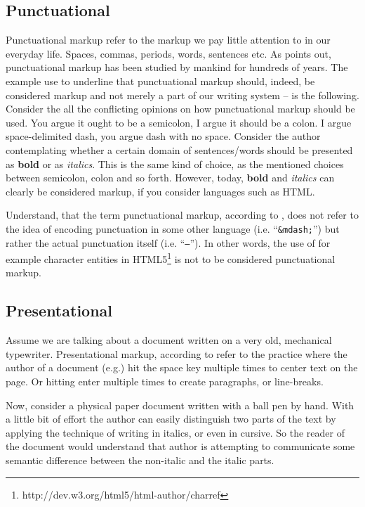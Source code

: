\documentclass{scrreprt}
\begin{document}
\subsection{Punctuational}
Punctuational markup refer to the markup we pay little attention to in our everyday life. Spaces, commas, periods, words, sentences etc. As \citet{coombs} points out, punctuational markup has been studied by mankind for hundreds of years. The example \citet{coombs} use to underline that punctuational markup should, indeed, be considered markup and not merely a part of our writing system -- is the following. Consider the all the conflicting opinions on how punctuational markup should be used. You argue it ought to be a  semicolon, I argue it should be a colon. I argue space-delimited dash, you argue dash with no space. Consider the author contemplating whether a certain domain of sentences/words should be presented as \textbf{bold} or as \textit{italics}. This is the same kind of choice, as the mentioned choices between semicolon, colon and so forth. However, today, \textbf{bold} and \textit{italics} can clearly be considered markup, if you consider languages such as HTML.

Understand, that the term punctuational markup, according to \citet{coombs}, does not refer to the idea of encoding punctuation in some other language (i.e. ``\texttt{\&mdash;}'') but rather the actual punctuation itself (i.e. ``\texttt{--}''). In other words, the use of for example character entities in HTML5\footnote{http://dev.w3.org/html5/html-author/charref} is not to be considered punctuational markup.




\subsection{Presentational}
Assume we are talking about a document written on a very old, mechanical typewriter. Presentational markup, according to \citet{coombs} refer to the practice where the author of a document (e.g.) hit the space key multiple times to center text on the page. Or hitting enter multiple times to create paragraphs, or line-breaks.

Now, consider a physical paper document written with a ball pen by hand. With a little bit of effort the author can easily distinguish two parts of the text by applying the technique of writing in italics, or even in cursive. So the reader of the document would understand that author is attempting to communicate some semantic difference between the non-italic and the italic parts.
\end{document}
